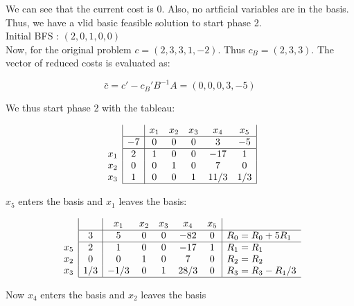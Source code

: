 We can see that the current cost is 0. Also, no artficial variables are in the basis. Thus, we have a vlid basic feasible solution to start phase 2. \\

Initial BFS : $(2,0,1,0,0)$ \\

Now, for the original problem $c = (2,3,3,1,-2)$. Thus $c_B = (2,3,3)$. The vector of reduced costs is evaluated as:

\[ \bar{c} = c' - c_B'B^{-1}A = (0,0,0,3,-5)\]

We thus start phase 2 with the tableau:


$$
\begin{array}{c}
\\
\\
x_1\\
x_2 \\
x_3 \\ 
\end{array}
\begin{array}{|c|ccccc|}
     & x_1 & x_2 & x_3 & x_4 & x_5  \\ \hline
   -7 & 0 & 0 & 0 & 3 & -5 \\ \hline
   2 & 1 & 0 & 0  & -17  & 1 \\
   0 & 0 & 1 & 0 & 7 & 0  \\
   1 & 0 & 0 & 1 & 11/3 & 1/3 \\ \hline
\end{array}
$$

$x_5$ enters the basis and $x_1$ leaves the basis:

$$
\begin{array}{c}
\\
\\
x_5\\
x_2 \\
x_3 \\ 
\end{array}
\begin{array}{|c|ccccc|l}
     & x_1 & x_2 & x_3 & x_4 & x_5  \\ \hline
   3 & 5 & 0 & 0 & -82 & 0 & R_0 = R_0 + 5R_1\\ \hline
   2 & 1 & 0 & 0  & -17  & 1 & R_1 = R_1\\
   0 & 0 & 1 & 0 & 7 & 0  & R_2 = R_2\\
   1/3 & -1/3 & 0 & 1 & 28/3 & 0 & R_3 = R_3 - R_1/3 \\ \hline
\end{array}
$$

Now $x_4$ enters the basis and $x_2$ leaves the basis

